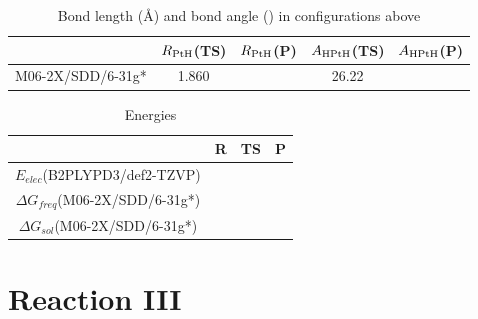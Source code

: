 \documentclass[10pt,aspectratio=43,mathserif]{beamer}
\begin{document}
\begin{frame}
\begin{figure}
\end{figure}
\begin{table}[H]
	\centering
	\begin{tabular}{ccccc}
		\hline
		& $ R_{\ce{PtH}} $(TS) & $ R_{\ce{PtH}} $(P) & $ A_{\ce{HPtH}} $(TS) & $ A_{\ce{HPtH}} $(P)\\ \hline
		M06-2X/SDD/6-31g* & 1.860 &  & 26.22 &  \\
		\hline
	\end{tabular}
    \caption{Bond length (\AA) and bond angle (\textdegree) in configurations above}
\end{table}
\begin{table}[H]
	\centering
	\begin{tabular}{cccc}
		\hline
		& R & TS & P \\ \hline
		$ E_{elec} $(B2PLYPD3/def2-TZVP) &  &  &    \\
		$ \Delta G_{freq} $(M06-2X/SDD/6-31g*) &  &  &    \\
		$ \Delta G_{sol} $(M06-2X/SDD/6-31g*) & & & \\
		\hline
	\end{tabular}
	\caption{Energies}
\end{table}
\end{frame}


\section{Reaction III}
\begin{frame}


\end{frame}
%
%
\end{document}
